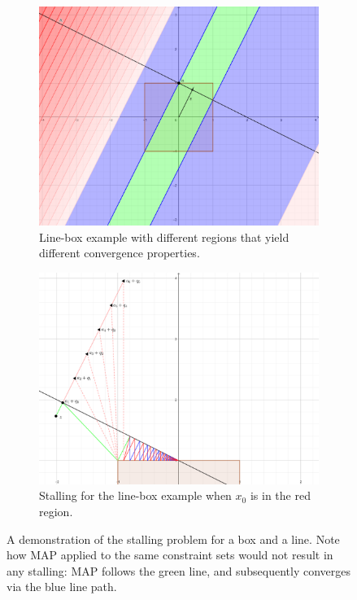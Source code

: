 \documentclass[hidelinks]{article}
\begin{document}
\begin{figure}[h]
    \centering
    
    \begin{subfigure}[t]{0.49\textwidth}
        \centering
        \includegraphics[width=1\textwidth]{StallingRegionsHand.png}
        \caption{Line-box example with different regions that yield different convergence properties.}
        \label{fig:region}
    \end{subfigure}
    \hfill
    \begin{subfigure}[t]{0.49\textwidth}
        \centering
        \includegraphics[width=1\textwidth]{DifferentSequences.png}
        \caption{Stalling for the line-box example when $x_0$ is in the red region.}
        \label{fig:stalling}
    \end{subfigure}
    \caption{A demonstration of the stalling problem for a box and a line. Note how MAP applied to the same constraint sets would not result in any stalling: MAP follows the green line, and subsequently converges via the blue line path.}
    \label{fig:baushkeStall}
\end{figure}
%
\newpage
%
\end{document}
